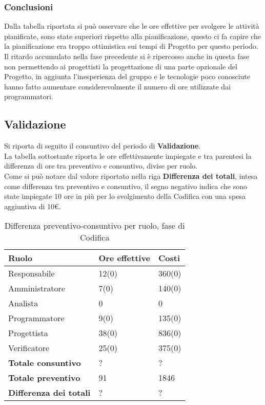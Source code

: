 \subsubsection{Conclusioni}

Dalla tabella riportata si può osservare che le ore effettive per svolgere le attività pianificate, sono state superiori rispetto alla pianificazione, questo ci fa capire che la pianificazione era troppo ottimistica sui tempi di Progetto per questo periodo.
Il ritardo accumulato nella fase precedente si è ripercosso anche in questa fase non permettendo ai progettisti la progettazione di una parte opzionale del Progetto, in aggiunta l'inesperienza del gruppo e le tecnologie poco conosciute hanno fatto aumentare considerevolmente il numero di ore utilizzate dai programmatori.



\subsection{Validazione}

Si riporta di seguito il consuntivo del periodo di \textbf{Validazione}.\\
La tabella sottostante riporta le ore effettivamente impiegate e tra parentesi la differenza di ore tra preventivo e consuntivo, divise per ruolo.\\ Come si può notare dal valore riportato nella riga \textbf{Differenza dei totali}, intesa come differenza tra preventivo e consuntivo, il segno negativo indica che sono state impiegate 10 ore in più per lo svolgimento della Codifica con una spesa aggiuntiva di 10\euro.

	\begin{table}[H]
		\centering
	  \begin{tabular}{p{}p{}
		    							p{}}
		   \toprule Ruolo & Ore effettive & Costi \\
		   \midrule
		   Responsabile & 12(0) & 360(0) \\
		   Amministratore & 7(0) & 140(0) \\
		   Analista & 0 & 0 \\
		   Programmatore & 9(0) & 135(0) \\
		   Progettista & 38(0) & 836(0) \\
		   Verificatore & 25(0) & 375(0) \\
		   \hline
		   \textbf{Totale consuntivo} & ? & ? \\
		   \textbf{Totale preventivo} & 91 & 1846 \\
		   \textbf{Differenza dei totali} & ? & ? \\
		   \bottomrule
	 \end{tabular}
	 	\label{tab:costuntivoCodifica}
	 	\caption{Differenza preventivo-consuntivo per ruolo, fase di Codifica}
	\end{table}

